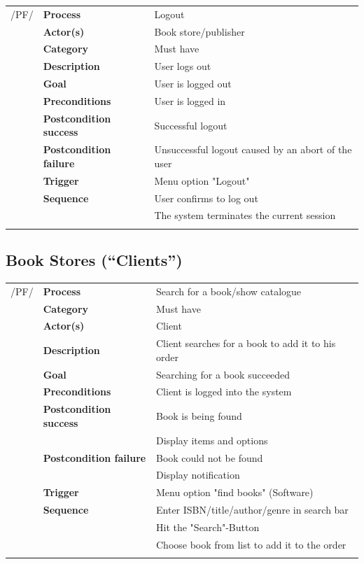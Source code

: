 \documentclass[11pt,a4paper,oneside,svgnames]{report}
\begin{document}
\noindent
\begin{tabular}{p{1.5cm}p{3cm}p{8cm}}
/PF/	& \textbf{Process} & Logout\\
		& \textbf{Actor(s)} & Book store/publisher\\
		& \textbf{Category} & Must have\\
		& \textbf{Description}	 & User logs out\\
		& \textbf{Goal} & User is logged out\\
		& \textbf{Preconditions} & User is logged in\\
		& \textbf{Postcondition success} & Successful logout\\
		& \textbf{Postcondition failure} & Unsuccessful logout caused by an abort of the user\\
		& \textbf{Trigger} & Menu option "Logout"\\
		& \textbf{Sequence} & User confirms to log out\\
		& & The system terminates the current session\\
\hfill \\
\end{tabular}


\subsection{Book Stores (``Clients'')}

\noindent
\begin{tabular}{p{1.5cm}p{3cm}p{8cm}}
	 /PF/	& \textbf{Process} & Search for a book/show catalogue\\ 
		& \textbf{Category} & Must have\\
		& \textbf{Actor(s)} & Client\\ 
		& \textbf{Description}	 & Client searches for a book to add it to his order\\ 
		& \textbf{Goal} & Searching for a book succeeded\\
		& \textbf{Preconditions} & Client is logged into the system\\
		& \textbf{Postcondition success} & Book is being found\\
		& & Display items and options\\
		& \textbf{Postcondition failure} & Book could not be found\\
		& & Display notification\\
		& \textbf{Trigger} & Menu option "find books" (Software)\\
		& \textbf{Sequence} & Enter ISBN/title/author/genre in search bar\\
		& & Hit the "Search"-Button\\
		& & Choose book from list to add it to the order\\
\hfill \\
\end{tabular}
\end{document}
